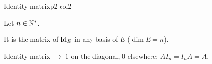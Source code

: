 \documentclass[course,noautoquant,noautokw]{neyvia-study}
\begin{document}
\begin{concept}[1.47]{Identity matrix}{p2 col2}
\begin{definition}
\noindent Let $n\in\mathbb{N}^*$.
\par\noindent It is the matrix of $\mathrm{Id}_E$ in any basis of $E$ ($\dim E=n$).
\end{definition}
\begin{reflex}
Identity matrix \ensuremath{\rightarrow} $1$ on the diagonal, $0$ elsewhere; $AI_n=I_nA=A$.
\end{reflex}
\begin{traps}
\end{traps}
\end{concept}
\end{document}
